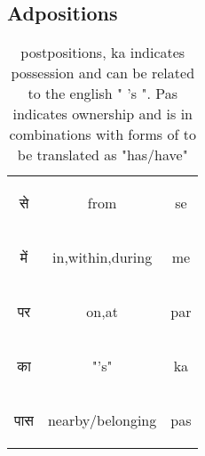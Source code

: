 \subsection{Adpositions}
\begin{table}[H]
    \centering
    \begin{tabular}{c|c|c}        
    \begin{hindi}से \end{hindi} & from & se \\
    \begin{hindi}में \end{hindi} & in,within,during & me \\
    \begin{hindi}पर \end{hindi} & on,at & par \\
    \begin{hindi}का \end{hindi} & "'s" & ka \\
    \begin{hindi} पास \end{hindi} & nearby/belonging & pas \\
    \end{tabular}
    \caption{postpositions, ka indicates possession and can be related to the english " 's ". Pas indicates ownership and is in combinations with forms of to be translated as "has/have"}
    \label{tab:postpositions}
\end{table}

\newpage 
